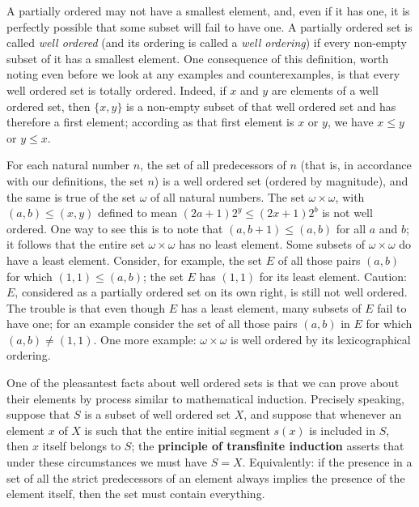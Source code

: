 
A partially ordered may not have a smallest element, and, even if it has one, it is perfectly possible that some subset will fail to have one. A partially ordered set is called \textit{well ordered} (and its ordering is called a \textit{well ordering}) if every non-empty subset of it has a smallest element. One consequence of this definition, worth noting even before we look at any examples and counterexamples, is that every well ordered set is totally ordered. Indeed, if $x$ and $y$ are elements of a well ordered set, then $\{ x,y \}$ is a non-empty subset of that well ordered set and has therefore a first element; according as that first element is $x$ or $y$, we have $x \le y$ or $y \le x$.

For each natural number $n$, the set of all predecessors of $n$ (that is, in accordance with our definitions, the set $n$) is a well ordered set (ordered by magnitude), and the same is true of the set $\omega$ of all natural numbers. The set $\omega \times \omega $, with $(a,b) \le (x,y)$ defined to mean $(2a + 1)2^{y} \le (2x + 1)2^{b}$ is not well ordered. One way to see this is to note that $(a,b + 1) \le (a,b)$ for all $a$ and $b$; it follows that the entire set $\omega \times \omega$ has no least element. Some subsets of $\omega \times \omega$ do have a least element. Consider, for example, the set $E$ of all those pairs $(a, b)$ for which $(1,1) \le (a,b)$; the set $E$ has $(1, 1)$ for its least element. Caution: $E$, considered as a partially ordered set on its own right, is still not well ordered. The trouble is that even though $E$ has a least element, many subsets of $E$ fail to have one; for an example consider the set of all those pairs $(a,b)$ in $E$ for which $(a,b) \neq (1, 1)$. One more example: $\omega \times \omega$ is well ordered by its lexicographical ordering. 

One of the pleasantest facts about well ordered sets is that we can prove about their elements by process similar to mathematical induction. Precisely speaking, suppose that $S$ is a subset of well ordered set $X$, and suppose that whenever an element $x$ of $X$ is such that the entire initial segment $s(x)$ is included in $S$, then $x$ itself belongs to $S$; the \textbf{principle of transfinite induction} asserts that under these circumstances we must have $S = X$. Equivalently: if the presence in a set of all the strict predecessors of an element always implies the presence of the element itself, then the set must contain everything. 

